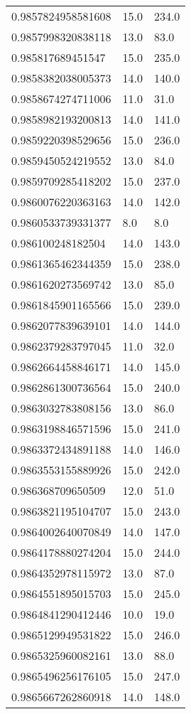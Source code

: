 \begin{center}
\begin{supertabular}[H]{p{0.30\textwidth}p{0.05\textwidth}p{0.05\textwidth}}
0.9857824958581608 & 15.0 & 234.0 \\ 
0.9857998320838118 & 13.0 & 83.0 \\ 
0.985817689451547 & 15.0 & 235.0 \\ 
0.9858382038005373 & 14.0 & 140.0 \\ 
0.9858674274711006 & 11.0 & 31.0 \\ 
0.9858982193200813 & 14.0 & 141.0 \\ 
0.9859220398529656 & 15.0 & 236.0 \\ 
0.9859450524219552 & 13.0 & 84.0 \\ 
0.9859709285418202 & 15.0 & 237.0 \\ 
0.9860076220363163 & 14.0 & 142.0 \\ 
0.9860533739331377 & 8.0 & 8.0 \\ 
0.986100248182504 & 14.0 & 143.0 \\ 
0.9861365462344359 & 15.0 & 238.0 \\ 
0.9861620273569742 & 13.0 & 85.0 \\ 
0.9861845901165566 & 15.0 & 239.0 \\ 
0.9862077839639101 & 14.0 & 144.0 \\ 
0.9862379283797045 & 11.0 & 32.0 \\ 
0.9862664458846171 & 14.0 & 145.0 \\ 
0.9862861300736564 & 15.0 & 240.0 \\ 
0.9863032783808156 & 13.0 & 86.0 \\ 
0.9863198846571596 & 15.0 & 241.0 \\ 
0.9863372434891188 & 14.0 & 146.0 \\ 
0.9863553155889926 & 15.0 & 242.0 \\ 
0.986368709650509 & 12.0 & 51.0 \\ 
0.9863821195104707 & 15.0 & 243.0 \\ 
0.9864002640070849 & 14.0 & 147.0 \\ 
0.9864178880274204 & 15.0 & 244.0 \\ 
0.9864352978115972 & 13.0 & 87.0 \\ 
0.9864551895015703 & 15.0 & 245.0 \\ 
0.9864841290412446 & 10.0 & 19.0 \\ 
0.9865129949531822 & 15.0 & 246.0 \\ 
0.9865325960082161 & 13.0 & 88.0 \\ 
0.9865496256176105 & 15.0 & 247.0 \\ 
0.9865667262860918 & 14.0 & 148.0 \\ 

\end{supertabular}
\end{center}
